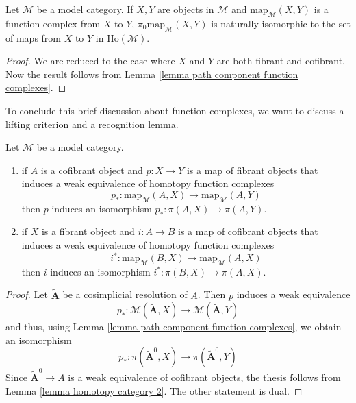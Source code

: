 \begin{refsection}
\begin{prop} \label{prop path component function complexes}
Let $\mathcal M$ be a model category. If $X,Y$ are objects in $\mathcal M$ and $\mathrm{map}_{\mathcal M}(X,Y)$ is a function complex from $X$ to $Y$, $\pi_0 \mathrm{map}_{\mathcal M}(X,Y)$ is naturally isomorphic to the set of maps from $X$ to $Y$ in $\mathrm{Ho}(\mathcal M)$.
\end{prop}

\begin{proof}
We are reduced to the case where $X$ and $Y$ are both fibrant and cofibrant. Now the result follows from Lemma \ref{lemma path component function complexes}.
\end{proof}

To conclude this brief discussion about function complexes, we want to discuss a lifting criterion and a recognition lemma.

\begin{lemma} \label{lemma lifting criterion function complexes}
Let $\mathcal M$ be a model category.
\begin{enumerate}
\item if $A$ is a cofibrant object and $p \colon X \to Y$ is a map of fibrant objects that induces a weak equivalence of homotopy function complexes
\[
p_* \colon \mathrm{map}_{\mathcal M}(A,X) \to \mathrm{map}_{\mathcal M}(A,Y)
\]
then $p$ induces an isomorphism $p_* \colon \pi(A,X) \to \pi(A,Y)$.

\item if $X$ is a fibrant object and $i \colon A \to B$ is a map of cofibrant objects that induces a weak equivalence of homotopy function complexes
\[
i^* \colon \mathrm{map}_{\mathcal M}(B,X) \to \mathrm{map}_{\mathcal M}(A,X)
\]
then $i$ induces an isomorphism $i^* \colon \pi(B,X) \to \pi(A,X)$.
\end{enumerate}
\end{lemma}

\begin{proof}
Let $\widetilde{\mathbf A}$ be a cosimplicial resolution of $A$. Then $p$ induces a weak equivalence
\[
p_* \colon \mathcal M (\widetilde{\mathbf A}, X) \to \mathcal M(\widetilde{\mathbf A},Y)
\]
and thus, using Lemma \ref{lemma path component function complexes}, we obtain an isomorphism
\[
p_* \colon \pi(\widetilde{\mathbf A}^0, X) \to \pi(\widetilde{\mathbf A}^0,Y)
\]
Since $\widetilde{\mathbf A}^0 \to A$ is a weak equivalence of cofibrant objects, the thesis follows from Lemma \ref{lemma homotopy category 2}. The other statement is dual.
\end{proof}


\end{refsection}
